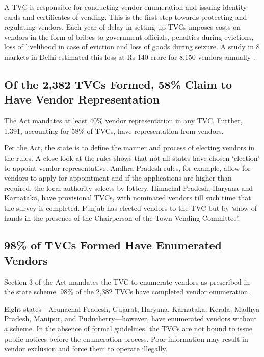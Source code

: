 \documentclass[a4paper, 12pt, twoside, table]{article}
\begin{document}
{	A TVC is responsible for conducting vendor enumeration and issuing identity cards and certificates of vending. This is the first step towards protecting and regulating vendors. Each year of delay in setting up TVCs imposes costs on vendors in the form of bribes to government officials, penalties during evictions, loss of livelihood in case of eviction and loss of goods during seizure. A study in 8 markets in Delhi estimated this loss at Rs 140 crore for 8,150 vendors annually \parencite{ratanpaper}.

\subsection*{Of the 2,382 TVCs Formed, 58\% Claim to Have Vendor Representation}
	
	The Act mandates at least 40\% vendor representation in any TVC. Further, 1,391, accounting for 58\% of TVCs, have representation from vendors.

	Per the Act, the state is to define the manner and process of electing vendors in the rules. A close look at the rules shows that not all states have chosen `election' to appoint vendor representative. Andhra Pradesh rules, for example, allow for vendors to apply for appointment and if the applications are higher than required, the local authority selects by lottery. Himachal Pradesh, Haryana and Karnataka, have provisional TVCs, with nominated vendors till such time that the survey is completed. Punjab has elected vendors to the TVC but by `show of hands in the presence of the Chairperson of the Town Vending Committee'.
	
\subsection*{98\% of TVCs Formed Have Enumerated Vendors}
	
	Section 3 of the Act mandates the TVC to enumerate vendors as prescribed in the state scheme. 98\% of the 2,382 TVCs have completed vendor enumeration.

	Eight states—Arunachal Pradesh, Gujarat, Haryana, Karnataka, Kerala, Madhya Pradesh, Manipur, and Puducherry—however, have enumerated vendors without a scheme. In the absence of formal guidelines, the TVCs are not bound to issue public notices before the enumeration process. Poor information may result in vendor exclusion and force them to operate illegally.

}
\end{document}
